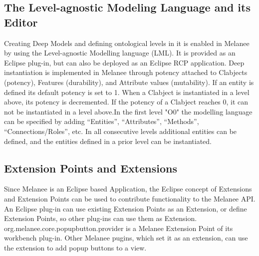\subsection{The Level-agnostic Modeling Language and its Editor}
Creating Deep Models and defining ontological levels in it is enabled in Melanee by using the Level-agnostic Modelling language (LML). It is provided as an Eclipse plug-in, but can also be deployed as an Eclipse RCP application. %
Deep instantiation is implemented in Melanee through potency attached to Clabjects (potency), Features (durability), and Attribute values (mutability)\cite{exe2015}. If an entity is defined its default potency is set to 1. When a Clabject is instantiated in a level above, its potency is decremented. If the potency of a Clabject reaches 0, it can not be instantiated in a level above.In the first level "O0" the modelling language can be specified by adding “Entities”, “Attributes”, “Methods”, “Connections/Roles”, etc. In all consecutive levels additional entities can be defined, and the entities defined in a prior level can be instantiated. 


\subsection{Extension Points and Extensions}
Since Melanee is an Eclipse based Application, the Eclipse concept of Extensions and Extension Points can be used to contribute functionality to the Melanee API. An Eclipse plug-in can use existing Extension Points as an Extension, or define Extension Points, so other plug-ins can use them as Extension. org.melanee.core.popupbutton.provider is a Melanee Extension Point of its workbench plug-in. Other Melanee pugins, which set it as an extension, can use the extension to add popup buttons to a view. 

